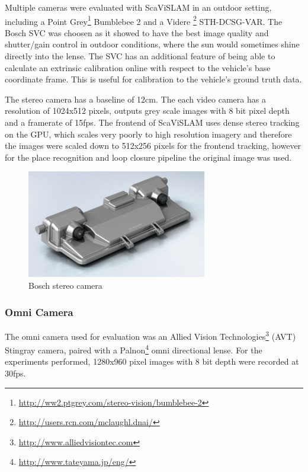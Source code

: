 Multiple cameras were evaluated with ScaViSLAM in an outdoor setting, including a Point Grey\footnote{\url{http://ww2.ptgrey.com/stereo-vision/bumblebee-2}} Bumblebee 2 and a Videre \footnote{\url{http://users.rcn.com/mclaughl.dnai/}} STH-DCSG-VAR.  The Bosch SVC was choosen as it showed to have the best image quality and shutter/gain control in outdoor conditions, where the sun would sometimes shine directly into the lense.  The SVC has an additional feature of being able to calculate an extrinsic calibration online with respect to the vehicle's base coordinate frame.  This is useful for calibration to the vehicle's ground truth data.

The stereo camera has a baseline of 12cm.  The each video camera has a resolution of 1024x512 pixels, outputs grey scale images with 8 bit pixel depth and a framerate of 15fps.  The frontend of ScaViSLAM uses dense stereo tracking on the GPU, which scales very poorly to high resolution imagery and therefore the images were scaled down to 512x256 pixels for the frontend tracking, however for the place recognition and loop closure pipeline the original image was used.

\begin{figure}[h]
  \centering
    \includegraphics[width=0.7\textwidth]{chapters/images/svc}
  \caption{Bosch stereo camera}
  \label{fig:bosch_svc}
\end{figure}

\subsubsection{Omni Camera}

The omni camera used for evaluation was an Allied Vision Technologies\footnote{\url{http://www.alliedvisiontec.com}} (AVT) Stingray camera, paired with a Palnon\footnote{\url{http://www.tateyama.jp/eng/}} omni directional lense.  For the experiments performed, 1280x960 pixel images with 8 bit depth were recorded at 30fps.  

